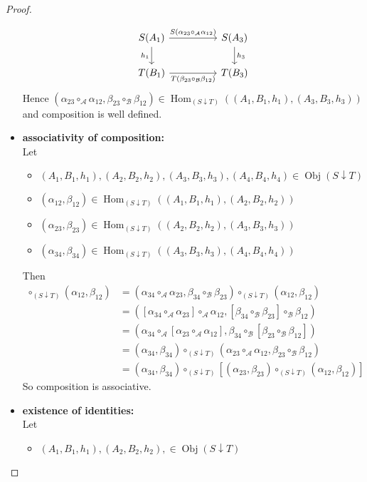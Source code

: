 \documentclass[12pt]{amsart}
\theoremstyle{definition}
\newcommand{\al}{\alpha}
\newcommand{\be}{\beta}
\newcommand{\MA}{\mathcal{A}}
\newcommand{\MB}{\mathcal{B}}
\DeclareMathOperator{\Obj}{Obj}
\DeclareMathOperator{\Hom}{Hom}
\DeclareMathOperator*{\0}{\mbf{0}}
\DeclareMathOperator*{\1}{\mbf{1}}
\begin{document}
\begin{proof}
\begin{itemize}
\[\begin{tikzcd}
				S(A_1) \arrow[rr, "S(\al_{23} \circ_{\MA} \al_{12})"] \arrow[d, "h_1"']&  & S(A_3)  \arrow[d, "h_3"] \\
				T(B_1) \arrow[rr, "T(\be_{23} \circ_{\MB} \be_{12})"']                       &  & T(B_3)
			\end{tikzcd}
			\]
			Hence $(\al_{23} \circ_{\MA} \al_{12}, \be_{23} \circ_{\MB} \be_{12}) \in \Hom_{(S \downarrow T)}((A_1, B_1, h_1), (A_3, B_3, h_3))$ and composition is well defined. \\
			\item \textbf{associativity of composition:} \\
			Let 
			\begin{itemize}
				\item $(A_1, B_1, h_1), (A_2, B_2, h_2), (A_3, B_3, h_3), (A_4, B_4, h_4) \in \Obj(S \downarrow T)$
				\item $(\al_{12}, \be_{12}) \in \Hom_{(S \downarrow T)}((A_1, B_1, h_1), (A_2, B_2, h_2))$ 
				\item $(\al_{23}, \be_{23}) \in \Hom_{(S \downarrow T)}((A_2, B_2, h_2), (A_3, B_3, h_3))$
				\item $(\al_{34}, \be_{34}) \in \Hom_{(S \downarrow T)}((A_3, B_3, h_3), (A_4, B_4, h_4))$
			\end{itemize}
			Then 
			\begin{align*}
				[ (\al_{34}, \be_{34}) \circ_{(S \downarrow T)} (\al_{23}, \be_{23}) ] \circ_{(S \downarrow T)} (\al_{12}, \be_{12})
				& = (\al_{34} \circ_{\MA} \al_{23}, \be_{34} \circ_{\MB} \be_{23}) \circ_{(S \downarrow T)} (\al_{12}, \be_{12}) \\
				& = ([\al_{34} \circ_{\MA} \al_{23}] \circ_{\MA} \al_{12}, [\be_{34} \circ_{\MB} \be_{23}] \circ_{\MB} \be_{12}) \\
				& =  (\al_{34} \circ_{\MA} [\al_{23} \circ_{\MA} \al_{12}], \be_{34} \circ_{\MB} [\be_{23} \circ_{\MB} \be_{12}]) \\
				& = (\al_{34}, \be_{34}) \circ_{(S \downarrow T)} (\al_{23} \circ_{\MA} \al_{12}, \be_{23} \circ_{\MB} \be_{12}) \\
				& = (\al_{34}, \be_{34}) \circ_{(S \downarrow T)} [(\al_{23}, \be_{23}) \circ_{(S \downarrow T)} (\al_{12}, \be_{12})]
			\end{align*}
			So composition is associative. \\
			\item \textbf{existence of identities:} \\
			Let
			\begin{itemize}
				\item $(A_1, B_1, h_1), (A_2, B_2, h_2), \in \Obj(S \downarrow T)$

\end{itemize}
\end{itemize}
\end{proof}
\end{document}

